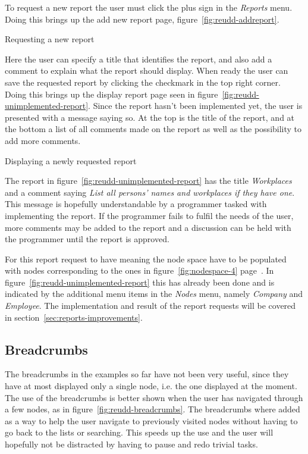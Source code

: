 \documentclass[a4paper]{report}
\begin{document}
To request a new report the user must click the plus sign in the \emph{Reports} menu. Doing this brings up the add new report page, figure~\ref{fig:reudd-addreport}. 

	{Requesting a new report}

Here the user can specify a title that identifies the report, and also add a comment to explain what the report should display. When ready the user can save the requested report by clicking the checkmark in the top right corner. Doing this brings up the display report page seen in figure~\ref{fig:reudd-unimplemented-report}. Since the report hasn't been implemented yet, the user is presented with a message saying so. At the top is the title of the report, and at the bottom a list of all comments made on the report as well as the possibility to add more comments.

	{Displaying a newly requested report}

The report in figure~\ref{fig:reudd-unimplemented-report} has the title \emph{Workplaces} and a comment saying \emph{List all persons' names and workplaces if they have one}. This message is hopefully understandable by a programmer tasked with implementing the report. If the programmer fails to fulfil the needs of the user, more comments may be added to the report and a discussion can be held with the programmer until the report is approved.

For this report request to have meaning the node space have to be populated with nodes corresponding to the ones in figure~\ref{fig:nodespace-4} page~\pageref{fig:nodespace-4}. In figure~\ref{fig:reudd-unimplemented-report} this has already been done and is indicated by the additional menu items in the \emph{Nodes} menu, namely \emph{Company} and \emph{Employee}. The implementation and result of the report requests will be covered in section~\ref{sec:reports-improvements}.

\subsection{Breadcrumbs}
The breadcrumbs in the examples so far have not been very useful, since they have at most displayed only a single node, i.e. the one displayed at the moment. The use of the breadcrumbs is better shown when the user has navigated through a few nodes, as in figure~\ref{fig:reudd-breadcrumbs}. The breadcrumbs where added as a way to help the user navigate to previously visited nodes without having to go back to the lists or searching. This speeds up the use and the user will hopefully not be distracted by having to pause and redo trivial tasks.
\end{document}
